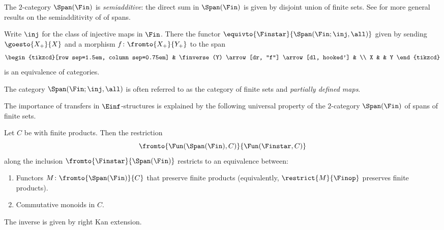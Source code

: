 \begin{observation}
	The $ 2 $-category $ \Span(\Fin) $ is \textit{semiadditive}: the direct sum in $ \Span(\Fin) $ is given by disjoint union of finite sets.
	See \cites[Lemma C.3]{MotivicNorms:BachmannHoyois}[Proposition 4.3]{MR3558219} for more general results on the semiadditivity of \categories of spans.
\end{observation}

\begin{observation}
	Write $ \inj $ for the class of injective maps in $ \Fin $.
	There the functor $ \equivto{\Finstar}{\Span(\Fin;\inj,\all)} $ given by sending $ \goesto{X_{+}}{X} $ and a morphism $ f \colon \fromto{X_{+}}{Y_{+}} $ to the span
	\begin{equation*}
		\begin{tikzcd}[row sep=1.5em, column sep=0.75em]
			& \finverse(Y) \arrow[dr, "f"] \arrow[dl, hooked'] & \\
			X & & Y 
		\end{tikzcd}
	\end{equation*}
	is an equivalence of categories.

	The category $ \Span(\Fin;\inj,\all) $ is often referred to as the category of finite sets and \textit{partially defined maps}.
\end{observation}

The importance of transfers in $ \Einf $-structures is explained by the following universal property of the $ 2 $-category $ \Span(\Fin) $ of spans of finite sets.

\begin{proposition}\label{prop:BH.C.1}
	Let $ C $ be \acategory with finite products.
	Then the restriction 
	\begin{equation*}
		\fromto{\Fun(\Span(\Fin),C)}{\Fun(\Finstar,C)}
	\end{equation*}
	along the inclusion $ \fromto{\Finstar}{\Span(\Fin)} $ restricts to an equivalence between:
	\begin{enumerate}
		\item Functors $ M \colon \fromto{\Span(\Fin)}{C} $ that preserve finite products (equivalently, $ \restrict{M}{\Finop} $ preserves finite products).

		\item Commutative monoids in $ C $.
	\end{enumerate}
	The inverse is given by right Kan extension.
\end{proposition}

